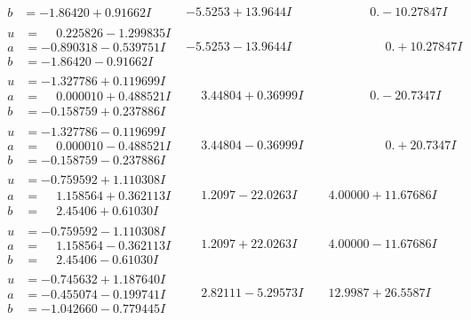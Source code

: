 \documentclass[1p]{elsarticle_modified}
\theoremstyle{definition}
\begin{document}
$$\begin{array}{c|c|c}
\begin{aligned}
b &= -1.86420 + 0.91662 I\end{aligned}
 & -5.5253 + 13.9644 I & \phantom{-0.000000 } 0. - 10.27847 I \\ \hline\begin{aligned}
u &= \phantom{-}0.225826 - 1.299835 I \\
a &= -0.890318 - 0.539751 I \\
b &= -1.86420 - 0.91662 I\end{aligned}
 & -5.5253 - 13.9644 I & \phantom{-0.000000 -}0. + 10.27847 I \\ \hline\begin{aligned}
u &= -1.327786 + 0.119699 I \\
a &= \phantom{-}0.000010 + 0.488521 I \\
b &= -0.158759 + 0.237886 I\end{aligned}
 & \phantom{-}3.44804 + 0.36999 I & \phantom{-0.000000 } 0. - 20.7347 I \\ \hline\begin{aligned}
u &= -1.327786 - 0.119699 I \\
a &= \phantom{-}0.000010 - 0.488521 I \\
b &= -0.158759 - 0.237886 I\end{aligned}
 & \phantom{-}3.44804 - 0.36999 I & \phantom{-0.000000 -}0. + 20.7347 I \\ \hline\begin{aligned}
u &= -0.759592 + 1.110308 I \\
a &= \phantom{-}1.158564 + 0.362113 I \\
b &= \phantom{-}2.45406 + 0.61030 I\end{aligned}
 & \phantom{-}1.2097 - 22.0263 I & \phantom{-}4.00000 + 11.67686 I \\ \hline\begin{aligned}
u &= -0.759592 - 1.110308 I \\
a &= \phantom{-}1.158564 - 0.362113 I \\
b &= \phantom{-}2.45406 - 0.61030 I\end{aligned}
 & \phantom{-}1.2097 + 22.0263 I & \phantom{-}4.00000 - 11.67686 I \\ \hline\begin{aligned}
u &= -0.745632 + 1.187640 I \\
a &= -0.455074 - 0.199741 I \\
b &= -1.042660 - 0.779445 I\end{aligned}
 & \phantom{-}2.82111 - 5.29573 I & \phantom{-}12.9987 + 26.5587 I \\ \hline\begin{aligned}

\end{aligned}
\end{array}$$
\end{document}

